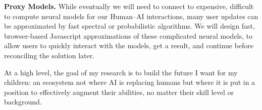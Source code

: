 \textbf{Proxy Models.}
%
While eventually we will need to connect to expensive, difficult to
compute neural models for our Human--AI interactions, many user updates can be approximated by fast
spectral or probabilistic algorithms.
%
We will design fast, browser-based Javascript approximations of these
complicated neural models, to allow users to quickly interact with the
models, get a result, and continue before reconciling the solution later.
%

At a high level, the goal of my research is to build the future I want for my children: an ecosystem not where AI is replacing humans but where it is put in a position to effectively augment their abilities, no matter their skill level or background.




\clearpage


